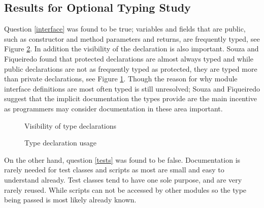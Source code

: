 \documentclass{sig-alternate}
\begin{document}
\subsection{Results for Optional Typing Study}
Question \ref{interface} was found to be true; variables and fields that are public, such as constructor and method parameters and returns, are frequently typed, see Figure \ref{Usage}. In addition the visibility of the declaration is also important. Souza and Fiqueiredo found that protected declarations are almost always typed and while public declarations are not as frequently typed as protected, they are typed more than private declarations, see Figure \ref{Visibility}. Though the reason for why module interface definitions are most often typed is still unresolved; Souza and Fiqueiredo suggest that the implicit documentation the types provide are the main incentive as programmers may consider documentation in these area important.

\begin{figure}
\centering
{}
\caption{Visibility of type declarations}
\label{Visibility}
\end{figure}

\begin{figure}
\centering
{}
\caption{Type declaration usage}
\label{Usage}
\end{figure}


On the other hand, question \ref{tests} was found to be false. Documentation is rarely needed for test classes and scripts as most are small and easy to understand already. Test classes tend to have one sole purpose, and are very rarely reused. While scripts can not be accessed by other modules so the type being passed is most likely already known. 
\end{document}
